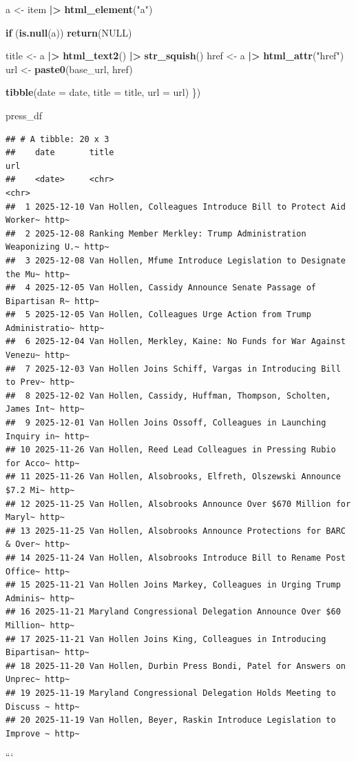 \documentclass[
]{article}
\newenvironment{Shaded}{\begin{snugshade}}{\end{snugshade}}
\newcommand{\AttributeTok}[1]{\textcolor[rgb]{0.13,0.29,0.53}{#1}}
\newcommand{\ConstantTok}[1]{\textcolor[rgb]{0.56,0.35,0.01}{#1}}
\newcommand{\ControlFlowTok}[1]{\textcolor[rgb]{0.13,0.29,0.53}{\textbf{#1}}}
\newcommand{\FunctionTok}[1]{\textcolor[rgb]{0.13,0.29,0.53}{\textbf{#1}}}
\newcommand{\NormalTok}[1]{#1}
\newcommand{\OtherTok}[1]{\textcolor[rgb]{0.56,0.35,0.01}{#1}}
\newcommand{\SpecialCharTok}[1]{\textcolor[rgb]{0.81,0.36,0.00}{\textbf{#1}}}
\newcommand{\StringTok}[1]{\textcolor[rgb]{0.31,0.60,0.02}{#1}}
\begin{document}
\begin{Shaded}
\begin{Highlighting}[]
\NormalTok{  a }\OtherTok{\textless{}{-}}\NormalTok{ item }\SpecialCharTok{|\textgreater{}} \FunctionTok{html\_element}\NormalTok{(}\StringTok{"a"}\NormalTok{)}
  

  \ControlFlowTok{if}\NormalTok{ (}\FunctionTok{is.null}\NormalTok{(a)) }\FunctionTok{return}\NormalTok{(}\ConstantTok{NULL}\NormalTok{)}
  
\NormalTok{  title }\OtherTok{\textless{}{-}}\NormalTok{ a }\SpecialCharTok{|\textgreater{}} \FunctionTok{html\_text2}\NormalTok{() }\SpecialCharTok{|\textgreater{}} \FunctionTok{str\_squish}\NormalTok{()}
\NormalTok{  href }\OtherTok{\textless{}{-}}\NormalTok{ a }\SpecialCharTok{|\textgreater{}} \FunctionTok{html\_attr}\NormalTok{(}\StringTok{"href"}\NormalTok{)}
\NormalTok{  url }\OtherTok{\textless{}{-}} \FunctionTok{paste0}\NormalTok{(base\_url, href)}

  \FunctionTok{tibble}\NormalTok{(}\AttributeTok{date =}\NormalTok{ date, }\AttributeTok{title =}\NormalTok{ title, }\AttributeTok{url =}\NormalTok{ url)}
\NormalTok{\})}

\NormalTok{press\_df}
\end{Highlighting}
\end{Shaded}

\begin{verbatim}
## # A tibble: 20 x 3
##    date       title                                                        url  
##    <date>     <chr>                                                        <chr>
##  1 2025-12-10 Van Hollen, Colleagues Introduce Bill to Protect Aid Worker~ http~
##  2 2025-12-08 Ranking Member Merkley: Trump Administration Weaponizing U.~ http~
##  3 2025-12-08 Van Hollen, Mfume Introduce Legislation to Designate the Mu~ http~
##  4 2025-12-05 Van Hollen, Cassidy Announce Senate Passage of Bipartisan R~ http~
##  5 2025-12-05 Van Hollen, Colleagues Urge Action from Trump Administratio~ http~
##  6 2025-12-04 Van Hollen, Merkley, Kaine: No Funds for War Against Venezu~ http~
##  7 2025-12-03 Van Hollen Joins Schiff, Vargas in Introducing Bill to Prev~ http~
##  8 2025-12-02 Van Hollen, Cassidy, Huffman, Thompson, Scholten, James Int~ http~
##  9 2025-12-01 Van Hollen Joins Ossoff, Colleagues in Launching Inquiry in~ http~
## 10 2025-11-26 Van Hollen, Reed Lead Colleagues in Pressing Rubio for Acco~ http~
## 11 2025-11-26 Van Hollen, Alsobrooks, Elfreth, Olszewski Announce $7.2 Mi~ http~
## 12 2025-11-25 Van Hollen, Alsobrooks Announce Over $670 Million for Maryl~ http~
## 13 2025-11-25 Van Hollen, Alsobrooks Announce Protections for BARC & Over~ http~
## 14 2025-11-24 Van Hollen, Alsobrooks Introduce Bill to Rename Post Office~ http~
## 15 2025-11-21 Van Hollen Joins Markey, Colleagues in Urging Trump Adminis~ http~
## 16 2025-11-21 Maryland Congressional Delegation Announce Over $60 Million~ http~
## 17 2025-11-21 Van Hollen Joins King, Colleagues in Introducing Bipartisan~ http~
## 18 2025-11-20 Van Hollen, Durbin Press Bondi, Patel for Answers on Unprec~ http~
## 19 2025-11-19 Maryland Congressional Delegation Holds Meeting to Discuss ~ http~
## 20 2025-11-19 Van Hollen, Beyer, Raskin Introduce Legislation to Improve ~ http~
\end{verbatim}

```
\end{document}
